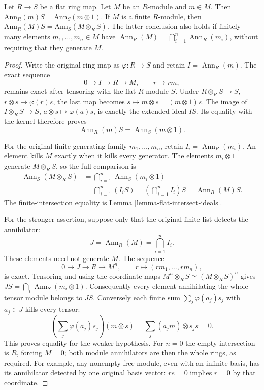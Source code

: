 \begin{lemma}
\label{lemma-annihilator-flat-base-change}
Let $R \to S$ be a flat ring map. Let $M$ be an $R$-module and
$m \in M$. Then $\text{Ann}_R(m) S = \text{Ann}_S(m \otimes 1)$.
If $M$ is a finite $R$-module, then
$\text{Ann}_R(M)S=\text{Ann}_S(M\otimes_R S)$.
The latter conclusion also holds if finitely many elements
$m_1,\ldots,m_n\in M$ have
$\operatorname{Ann}_R(M)=\bigcap_{i=1}^n\operatorname{Ann}_R(m_i)$,
without requiring that they generate $M$.
\end{lemma}

\begin{proof}
Write the original ring map as $\varphi:R\to S$ and retain
$I=\operatorname{Ann}_R(m)$. The exact sequence
$$
0\longrightarrow I\longrightarrow R\longrightarrow M,
\qquad r\longmapsto rm,
$$
remains exact after tensoring with the flat $R$-module $S$.
Under $R\otimes_RS\to S$, $r\otimes s\mapsto\varphi(r)s$,
the last map becomes $s\mapsto m\otimes s=(m\otimes1)s$.
The image of $I\otimes_RS\to S$, $a\otimes s\mapsto\varphi(a)s$,
is exactly the extended ideal $IS$. Its equality with the
kernel therefore proves
$$
\operatorname{Ann}_R(m)S=\operatorname{Ann}_S(m\otimes1).
$$

For the original finite generating family $m_1,\ldots,m_n$,
retain $I_i=\operatorname{Ann}_R(m_i)$. An element kills $M$
exactly when it kills every generator. The elements
$m_i\otimes1$ generate $M\otimes_RS$, so the full comparison is
$$
\begin{split}
\operatorname{Ann}_S(M\otimes_RS)
&=\bigcap_{i=1}^n\operatorname{Ann}_S(m_i\otimes1)\\
&=\bigcap_{i=1}^n(I_iS)
=\left(\bigcap_{i=1}^n I_i\right)S
=\operatorname{Ann}_R(M)S.
\end{split}
$$
The finite-intersection equality is
Lemma \ref{lemma-flat-intersect-ideals}.

For the stronger assertion, suppose only that the original
finite list detects the annihilator:
$$
J=\operatorname{Ann}_R(M)=\bigcap_{i=1}^n I_i.
$$
These elements need not generate $M$. The sequence
$$
0\longrightarrow J\longrightarrow R\longrightarrow M^n,
\qquad r\longmapsto(rm_1,\ldots,rm_n),
$$
is exact. Tensoring and using the coordinate maps
$M^n\otimes_RS\simeq(M\otimes_RS)^n$ gives
$JS=\bigcap_i\operatorname{Ann}_S(m_i\otimes1)$.
Consequently every element annihilating the whole tensor
module belongs to $JS$. Conversely each finite sum
$\sum_j\varphi(a_j)s_j$ with $a_j\in J$ kills every tensor:
$$
\left(\sum_j\varphi(a_j)s_j\right)(m\otimes s)
=\sum_j(a_jm)\otimes s_js=0.
$$
This proves equality for the weaker hypothesis. For $n=0$
the empty intersection is $R$, forcing $M=0$; both module
annihilators are then the whole rings, as required.
For example, any nonempty free module, even with an infinite
basis, has its annihilator detected by one original basis
vector: $re=0$ implies $r=0$ by that coordinate.


\end{proof}
